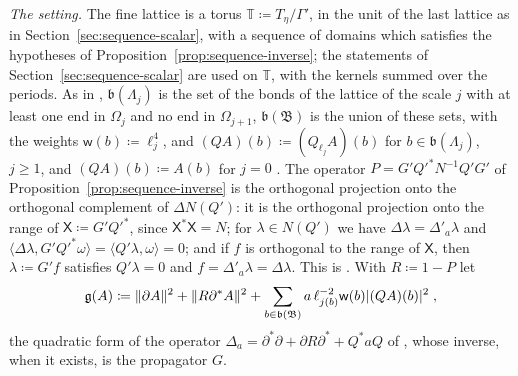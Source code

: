 \documentclass[11pt]{preprint}
\DeclarePairedDelimiter{\abs}{\lvert}{\rvert}
\DeclarePairedDelimiter{\norm}{\lVert}{\rVert}
\numberwithin{equation}{section}
\theoremstyle{definition}
\theoremstyle{remark}
\theoremstyle{plain}
\begin{document}
\emph{The setting.} The fine lattice is a torus $\mathbb T \coloneqq T_\eta/\Gamma'$, in the unit of the last lattice as in Section~\ref{sec:sequence-scalar}, with a sequence of domains which satisfies the hypotheses of Proposition~\ref{prop:sequence-inverse}; the statements of Section~\ref{sec:sequence-scalar} are used on $\mathbb T$, with the kernels summed over the periods. As in \cite[(2.3)]{BalabanPRT2}, $\mathfrak b(\Lambda_j)$ is the set of the bonds of the lattice of the scale $j$ with at least one end in $\Omega_j$ and no end in $\Omega_{j+1}$, $\mathfrak b(\mathfrak B)$ is the union of these sets, with the weights $\mathsf w(b) \coloneqq \ell_j^4$, and $(QA)(b) \coloneqq (Q_{\ell_j}A)(b)$ for $b \in \mathfrak b(\Lambda_j)$, $j \geq 1$, and $(QA)(b) \coloneqq A(b)$ for $j = 0$ \cite[(2.20)]{BalabanPRT2}. The operator $P = G'Q'^*N^{-1}Q'G'$ of Proposition~\ref{prop:sequence-inverse} is the orthogonal projection onto the orthogonal complement of $\Delta N(Q')$: it is the orthogonal projection onto the range of $\mathsf X \coloneqq G'Q'^*$, since $\mathsf X^*\mathsf X = N$; for $\lambda \in N(Q')$ we have $\Delta\lambda = \Delta'_a\lambda$ and $\langle\Delta\lambda, G'Q'^*\omega\rangle = \langle Q'\lambda, \omega\rangle = 0$; and if $f$ is orthogonal to the range of $\mathsf X$, then $\lambda \coloneqq G'f$ satisfies $Q'\lambda = 0$ and $f = \Delta'_a\lambda = \Delta\lambda$. This is \cite[(2.17)]{BalabanPRT2}. With $R \coloneqq 1 - P$ let
\begin{equation}\label{eq:sequence-form}
    \mathfrak g(A) \coloneqq \norm{\partial A}^2 + \norm{R\partial^*A}^2 + \sum_{b \in \mathfrak b(\mathfrak B)}a\,\ell_{j(b)}^{-2}\mathsf w(b)\abs{(QA)(b)}^2\;,
\end{equation}
the quadratic form of the operator $\Delta_a = \partial^*\partial + \partial R\partial^* + Q^*aQ$ of \cite[(2.19)]{BalabanPRT2}, whose inverse, when it exists, is the propagator $G$.
\end{document}
